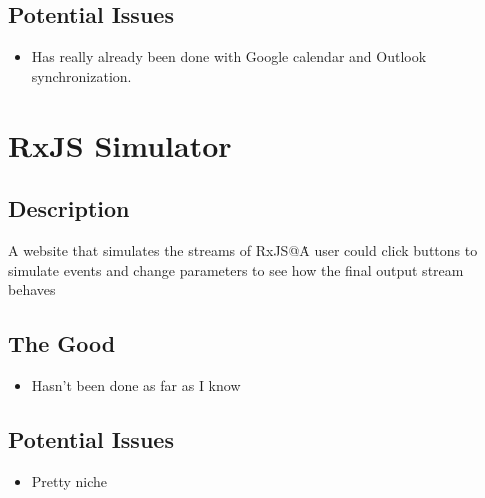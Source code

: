 \documentclass{article}
\begin{document}
\subsection*{Potential Issues}
\begin{itemize}
\item
  Has really already been done with Google calendar and Outlook
  synchronization.
\end{itemize}


\section{RxJS Simulator}
\subsection*{Description}
A website that simulates the streams of RxJS@\. A user could click buttons to
simulate events and change parameters to see how the final output stream
behaves
\subsection*{The Good}
\begin{itemize}
\item
  Hasn't been done as far as I know
\end{itemize}
\subsection*{Potential Issues}
\begin{itemize}
  \item
    Pretty niche
\end{itemize}
\end{document}

